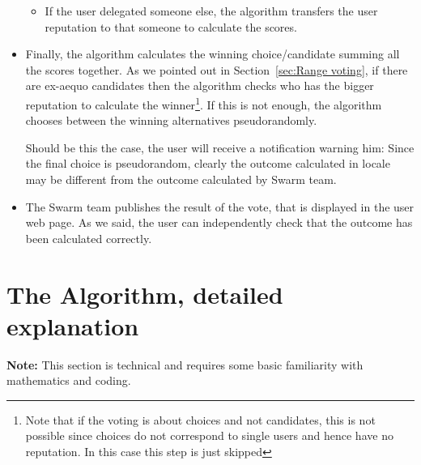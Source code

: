 \documentclass[submission, copyright,creativecommons,sharealike,noncommercial]{eptcs}
\begin{document}
\begin{itemize}
\begin{itemize}
				\item If the user delegated someone else, the algorithm transfers the user reputation to that someone to calculate the scores.
			\end{itemize}
			\item Finally, the algorithm calculates the winning choice/candidate summing all the scores together. As we pointed out in Section~\ref{sec:Range voting}, if there are ex-aequo candidates then the algorithm checks who has the bigger reputation to calculate the winner\footnote{Note that if the voting is about choices and not candidates, this is not possible since choices do not correspond to single users and hence have no reputation. In this case this step is just skipped}. If this is not enough, the algorithm chooses between the winning alternatives pseudorandomly.
			
			Should be this the case, the user will receive a notification warning him: Since the final choice is pseudorandom, clearly the outcome calculated in locale may be different from the outcome calculated by Swarm team.
			
			\item The Swarm team publishes the result of the vote, that is displayed in the user web page. As we said, the user can independently check that the outcome has been calculated correctly.
		\end{itemize}
%
%
\section{The Algorithm, detailed explanation}\label{sec:Algorithm technical explanation}
%
	\textbf{Note:} This section is technical and requires some basic familiarity with mathematics and coding. 
%
%
\end{document}
